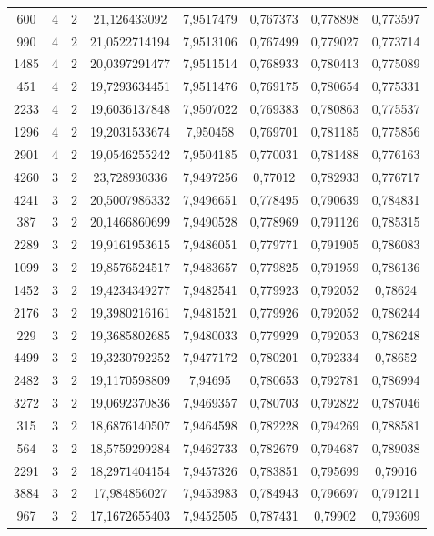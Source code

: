 \begin{longtable}{|c|c|c|c|c|c|c|c|}
600 & 4 & 2 & 21,126433092 & 7,9517479 & 0,767373 & 0,778898 & 0,773597 \\
990 & 4 & 2 & 21,0522714194 & 7,9513106 & 0,767499 & 0,779027 & 0,773714 \\
1485 & 4 & 2 & 20,0397291477 & 7,9511514 & 0,768933 & 0,780413 & 0,775089 \\
451 & 4 & 2 & 19,7293634451 & 7,9511476 & 0,769175 & 0,780654 & 0,775331 \\
2233 & 4 & 2 & 19,6036137848 & 7,9507022 & 0,769383 & 0,780863 & 0,775537 \\
1296 & 4 & 2 & 19,2031533674 & 7,950458 & 0,769701 & 0,781185 & 0,775856 \\
2901 & 4 & 2 & 19,0546255242 & 7,9504185 & 0,770031 & 0,781488 & 0,776163 \\
4260 & 3 & 2 & 23,728930336 & 7,9497256 & 0,77012 & 0,782933 & 0,776717 \\
4241 & 3 & 2 & 20,5007986332 & 7,9496651 & 0,778495 & 0,790639 & 0,784831 \\
387 & 3 & 2 & 20,1466860699 & 7,9490528 & 0,778969 & 0,791126 & 0,785315 \\
2289 & 3 & 2 & 19,9161953615 & 7,9486051 & 0,779771 & 0,791905 & 0,786083 \\
1099 & 3 & 2 & 19,8576524517 & 7,9483657 & 0,779825 & 0,791959 & 0,786136 \\
1452 & 3 & 2 & 19,4234349277 & 7,9482541 & 0,779923 & 0,792052 & 0,78624 \\
2176 & 3 & 2 & 19,3980216161 & 7,9481521 & 0,779926 & 0,792052 & 0,786244 \\
229 & 3 & 2 & 19,3685802685 & 7,9480033 & 0,779929 & 0,792053 & 0,786248 \\
4499 & 3 & 2 & 19,3230792252 & 7,9477172 & 0,780201 & 0,792334 & 0,78652 \\
2482 & 3 & 2 & 19,1170598809 & 7,94695 & 0,780653 & 0,792781 & 0,786994 \\
3272 & 3 & 2 & 19,0692370836 & 7,9469357 & 0,780703 & 0,792822 & 0,787046 \\
315 & 3 & 2 & 18,6876140507 & 7,9464598 & 0,782228 & 0,794269 & 0,788581 \\
564 & 3 & 2 & 18,5759299284 & 7,9462733 & 0,782679 & 0,794687 & 0,789038 \\
2291 & 3 & 2 & 18,2971404154 & 7,9457326 & 0,783851 & 0,795699 & 0,79016 \\
3884 & 3 & 2 & 17,984856027 & 7,9453983 & 0,784943 & 0,796697 & 0,791211 \\
967 & 3 & 2 & 17,1672655403 & 7,9452505 & 0,787431 & 0,79902 & 0,793609 \\

\end{longtable}
